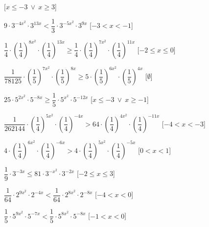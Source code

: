 \begin{esercizio}
\begin{enumeratea}
   \hfill [\(x \leqslant -3~\vee~x \geqslant 3\)]
  \item  \(9 \cdot 3^{{-4x^2}} \cdot 3^{{13x}} < \dfrac{1}{3} \cdot 
3^{{-5x^2}} \cdot 3^{{9x}}\)
   \hfill [\(-3 < x < -1\)]
  \item  \(\dfrac{1}{4} \cdot \left(\dfrac{1}{4}\right)^{{8x^2}} \cdot 
\left(\dfrac{1}{4}\right)^{{13x}} \geqslant \dfrac{1}{4} \cdot 
\left(\dfrac{1}{4}\right)^{{7x^2}} \cdot \left(\dfrac{1}{4}\right)^{{11x}}\)
   \hfill [\(-2 \leqslant x \leqslant 0\)]
  \item  \(\dfrac{1}{78125} \cdot \left(\dfrac{1}{5}\right)^{{7x^2}} \cdot 
\left(\dfrac{1}{5}\right)^{{8x}} \geqslant 5 \cdot 
\left(\dfrac{1}{5}\right)^{{6x^2}} \cdot \left(\dfrac{1}{5}\right)^{{4x}}\)
   \hfill [\(\emptyset\)]
  \item  \(25 \cdot 5^{{2x^2}} \cdot 5^{{-8x}} \geqslant \dfrac{1}{5} \cdot 
5^{{x^2}} \cdot 5^{{-12x}}\)
   \hfill [\(x \leqslant -3~\vee~x \geqslant -1\)]
  \item  \(\dfrac{1}{262144} \cdot \left(\dfrac{1}{4}\right)^{{5x^2}} \cdot 
\left(\dfrac{1}{4}\right)^{{-4x}} > 64 \cdot 
\left(\dfrac{1}{4}\right)^{{4x^2}} \cdot 
\left(\dfrac{1}{4}\right)^{{-11x}}\)
   \hfill [\(-4 < x < -3\)]
  \item  \(4 \cdot \left(\dfrac{1}{4}\right)^{{6x^2}} \cdot 
\left(\dfrac{1}{4}\right)^{{-6x}} > 4 \cdot 
\left(\dfrac{1}{4}\right)^{{5x^2}} \cdot \left(\dfrac{1}{4}\right)^{{-5x}}\)
   \hfill [\(0 < x < 1\)]
  \item  \(\dfrac{1}{9} \cdot 3^{{-3x}} \leqslant 81 \cdot 3^{{-x^2}} \cdot 
3^{{-2x}}\)
   \hfill [\(-2 \leqslant x \leqslant 3\)]
  \item  \(\dfrac{1}{64} \cdot 2^{{9x^2}} \cdot 2^{{-4x}} < \dfrac{1}{64} 
\cdot 2^{{8x^2}} \cdot 2^{{-8x}}\)
   \hfill [\(-4 < x < 0\)]
  \item  \(\dfrac{1}{5} \cdot 5^{{9x^2}} \cdot 5^{{-7x}} < \dfrac{1}{5} 
\cdot 5^{{8x^2}} \cdot 5^{{-8x}}\)
   \hfill [\(-1 < x < 0\)]
 \end{enumeratea}
\end{esercizio}


